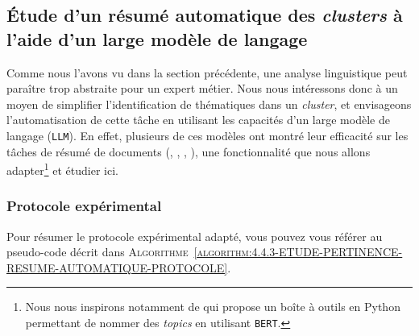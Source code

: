 	
	\subsection{Étude d'un résumé automatique des \textit{clusters} à l'aide d'un large modèle de langage}
	\label{section:4.4.3-ETUDE-PERTINENCE-RESUME-AUTOMATIQUE}
		
		Comme nous l'avons vu dans la section précédente, une analyse linguistique peut paraître trop abstraite pour un expert métier.
		Nous nous intéressons donc à un moyen de simplifier l'identification de thématiques dans un \textit{cluster}, et envisageons l'automatisation de cette tâche en utilisant les capacités d'un large modèle de langage (\texttt{LLM}).
		En effet, plusieurs de ces modèles ont montré leur efficacité sur les tâches de résumé de documents (\cite{zhang-etal:2019:pegasus-pretraining-extracted}, \cite{lewis-etal:2019:bart-denoising-sequencetosequence}, \cite{radford-etal:2019:language-models-are}, \cite{brown-etal:2020:language-models-are}), une fonctionnalité que nous allons adapter\footnote{
			Nous nous inspirons notamment de \cite{alammar-grefenstette:2022:cohere-sandbox} qui propose un boîte à outils en Python permettant de nommer des \textit{topics} en utilisant \texttt{BERT}.
		}
		et étudier ici.
	
		\subsubsection{Protocole expérimental}
			
			Pour résumer le protocole expérimental adapté, vous pouvez vous référer au pseudo-code décrit dans \textsc{Algorithme~\ref{algorithm:4.4.3-ETUDE-PERTINENCE-RESUME-AUTOMATIQUE-PROTOCOLE}}.
			
